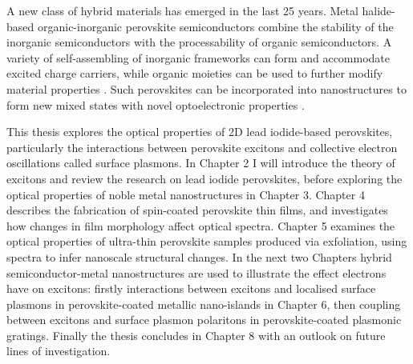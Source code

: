 A new class of hybrid materials has emerged in the last 25 years. Metal halide-based organic-inorganic perovskite semiconductors combine the stability of the inorganic semiconductors with the processability of organic semiconductors. A variety of self-assembling of inorganic frameworks can form and accommodate excited charge carriers, while organic moieties can be used to further modify material properties \cite{Cheng2010, Ishihara1990, Mitzi2001, Mitzi2001c, Nagami1996, Pradeesh2010, Pradeesh2009a, Lee2012, Heo2013, Liu2013, Hao2014}. Such perovskites can be incorporated into nanostructures to form new mixed states with novel optoelectronic properties \cite{Fujita1998, Fujita1999, Fujita2000, Ishi-Hayase2003, Brehier2006, Lanty2008, Pradeesh2009b, Sumioka2001}.

This thesis explores the optical properties of 2D lead iodide-based perovskites, particularly the interactions between perovskite excitons and collective electron oscillations called surface plasmons. In Chapter 2 I will introduce the theory of excitons and review the research on lead iodide perovskites, before exploring the optical properties of noble metal nanostructures in Chapter 3. Chapter 4 describes the fabrication of spin-coated perovskite thin films, and investigates how changes in film morphology affect optical spectra. Chapter 5 examines the optical properties of ultra-thin perovskite samples produced via exfoliation, using spectra to infer nanoscale structural changes. In the next two Chapters hybrid semiconductor-metal nanostructures are used to illustrate the effect electrons have on excitons: firstly interactions between excitons and localised surface plasmons in perovskite-coated metallic nano-islands in Chapter 6, then coupling between excitons and surface plasmon polaritons in perovskite-coated plasmonic gratings. Finally the thesis concludes in Chapter 8 with an outlook on future lines of investigation.
